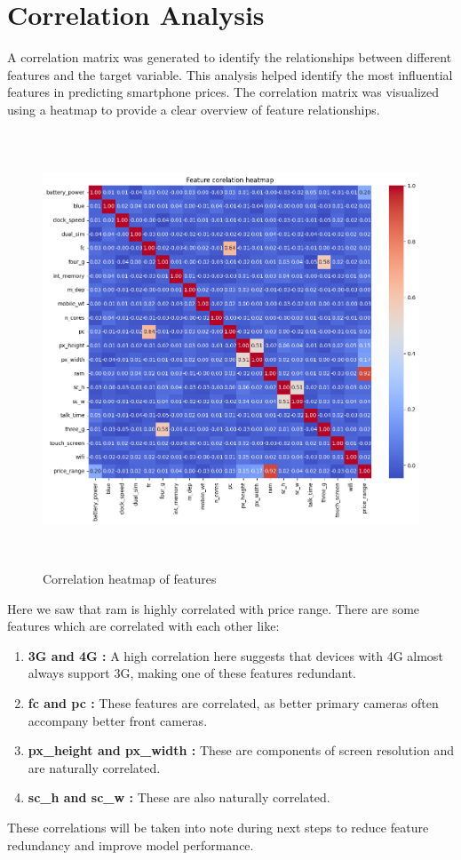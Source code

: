 \documentclass[12pt]{report}
\begin{document}
\section{Correlation Analysis}
A correlation matrix was generated to identify the relationships between different features and the target variable. This analysis helped identify the most influential features in predicting smartphone prices. The correlation matrix was visualized using a heatmap to provide a clear overview of feature relationships.
\begin{figure}[H]
	\centering
	\includegraphics[height=35em]{corr_viz.png}
	\caption{Correlation heatmap of features}
	\label{corr_viz}
\end{figure}
Here we saw that ram is highly correlated with price range. There are some features which are correlated with each other like:
\vspace{-1.25em}
\begin{enumerate}
	\setlength\itemsep{-1.05em}
	\item{\textbf{3G and 4G :}} A high correlation here suggests that devices with 4G almost always support 3G, making one of these features redundant.
	\item{\textbf{fc and pc :}} These features are correlated, as better primary cameras often accompany better front cameras.
	\item{\textbf{px\_height and px\_width :}} These are components of screen resolution and are naturally correlated.
	\item{\textbf{sc\_h and sc\_w :}} These are also naturally correlated.
\end{enumerate}
These correlations will be taken into note during next steps to reduce feature redundancy and improve model performance.
\end{document}
